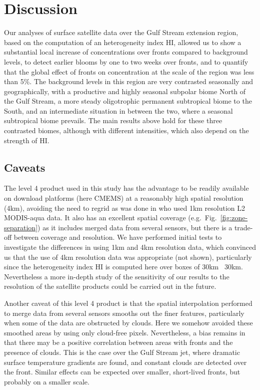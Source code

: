 \section{Discussion}

Our analyses of surface satellite data over the Gulf Stream extension region, based on the computation of an heterogeneity index HI, allowed us to show a substantial local increase of  concentrations over  fronts compared to background levels, to detect earlier blooms by one to two weeks over fronts, and to quantify that the global effect of fronts on  concentration at the scale of the region was less than 5\%.
The background levels in this region are very contrasted seasonally and geographically, with a productive and highly seasonal subpolar biome North of the Gulf Stream, a more steady oligotrophic permanent subtropical biome to the South, and an intermediate situation in between the two, where a seasonal subtropical biome prevails.
The main results above hold for these three contrasted biomes, although with different intensities, which also depend on the strength of HI.\@

\subsection{Caveats}

The level 4  product used in this study has the advantage to be readily available on download platforms (here CMEMS) at a reasonably high spatial resolution (4km), avoiding the need to regrid as was done in \citet{liu_2016} who used 1km resolution L2 MODIS-aqua data.
It also has an excellent spatial coverage (e.g.\ Fig.~\ref{fig:zone-separation}) as it includes merged data from several sensors, but there is a trade-off between coverage and resolution.
We have performed initial tests to investigate the differences in using 1km and 4km resolution  data, which convinced us that the use of 4km resolution data was appropriate (not shown), particularly since the heterogeneity index HI is computed here over boxes of 30km \texttimes\ 30km.
Nevertheless a more in-depth study of the sensitivity of our results to the resolution of the satellite products could be carried out in the future.

Another caveat of this level 4 product is that the spatial interpolation performed to merge data from several sensors smooths out the finer features, particularly when some of the data are obstructed by clouds.
Here we somehow avoided these smoothed areas by using only cloud-free  pixels.
Nevertheless, a bias remains in that there may be a positive correlation between areas with fronts and the presence of clouds.
This is the case over the Gulf Stream jet, where dramatic surface temperature gradients are found, and constant clouds are detected over the front.
Similar effects can be expected over smaller, short-lived fronts, but probably on a smaller scale.

